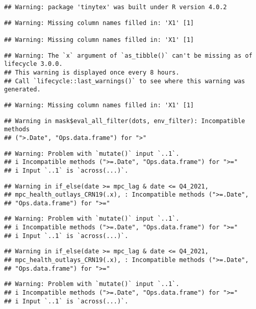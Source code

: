 \documentclass[
]{article}
\begin{document}
\begin{verbatim}
## Warning: package 'tinytex' was built under R version 4.0.2
\end{verbatim}

\begin{verbatim}
## Warning: Missing column names filled in: 'X1' [1]

## Warning: Missing column names filled in: 'X1' [1]
\end{verbatim}

\begin{verbatim}
## Warning: The `x` argument of `as_tibble()` can't be missing as of lifecycle 3.0.0.
## This warning is displayed once every 8 hours.
## Call `lifecycle::last_warnings()` to see where this warning was generated.
\end{verbatim}

\begin{verbatim}
## Warning: Missing column names filled in: 'X1' [1]
\end{verbatim}

\begin{verbatim}
## Warning in mask$eval_all_filter(dots, env_filter): Incompatible methods
## (">.Date", "Ops.data.frame") for ">"
\end{verbatim}

\begin{verbatim}
## Warning: Problem with `mutate()` input `..1`.
## i Incompatible methods (">=.Date", "Ops.data.frame") for ">="
## i Input `..1` is `across(...)`.
\end{verbatim}

\begin{verbatim}
## Warning in if_else(date >= mpc_lag & date <= Q4_2021,
## mpc_health_outlays_CRN19(.x), : Incompatible methods (">=.Date",
## "Ops.data.frame") for ">="
\end{verbatim}

\begin{verbatim}
## Warning: Problem with `mutate()` input `..1`.
## i Incompatible methods (">=.Date", "Ops.data.frame") for ">="
## i Input `..1` is `across(...)`.
\end{verbatim}

\begin{verbatim}
## Warning in if_else(date >= mpc_lag & date <= Q4_2021,
## mpc_health_outlays_CRN19(.x), : Incompatible methods (">=.Date",
## "Ops.data.frame") for ">="
\end{verbatim}

\begin{verbatim}
## Warning: Problem with `mutate()` input `..1`.
## i Incompatible methods (">=.Date", "Ops.data.frame") for ">="
## i Input `..1` is `across(...)`.
\end{verbatim}
\end{document}
